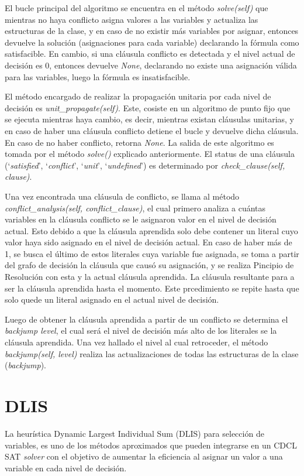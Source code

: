 El bucle principal del algoritmo se encuentra en el método \textit{solve(self)} que mientras no haya conflicto asigna valores a las variables y actualiza las estructuras de la clase, y en caso de no existir más variables por asignar, entonces devuelve la solución (asignaciones para cada variable) declarando la fórmula como satisfacible. En cambio, si una cláusula conflicto es detectada y el nivel actual de decisión es 0, entonces devuelve \textit{None}, declarando no existe una asignación válida para las variables, luego la fórmula es insatisfacible.

El método encargado de realizar la propagación unitaria por cada nivel de decisión es \textit{unit\_propagate(self)}. Este, cosiste en un algoritmo de punto fijo que se ejecuta mientras haya cambio, es decir, mientras existan cláusulas unitarias, y en caso de haber una cláusula conflicto detiene el bucle y devuelve dicha cláusula. En caso de no haber conflicto, retorna \textit{None}. La salida de este algoritmo es tomada por el método \textit{solve()} explicado anteriormente. El status de una cláusula (`\textit{satisfied}', `\textit{conflict}', `\textit{unit}', `\textit{undefined}') es determinado por \textit{check\_clause(self, clause)}.

Una vez encontrada una cláusula de conflicto, se llama al método \textit{conflict\_analysis(self, conflict\_clause)}, el cual primero analiza a cuántas variables en la cláusula conflicto se le asignaron valor en el nivel de decisión actual. Esto debido a que la cláusula aprendida solo debe contener un literal cuyo valor haya sido asignado en el nivel de decisión actual. En caso de haber más de 1, se busca el último de estos literales cuya variable fue asignada, se toma a partir del grafo de decisión la cláusula que causó su asignación, y se realiza Pincipio de Resolución con esta y la actual cláusula aprendida. La cláusula resultante para a ser la cláusula aprendida hasta el momento. Este prcedimiento se repite hasta que solo quede un literal asignado en el actual nivel de decisión.

Luego de obtener la cláusula aprendida a partir de un conflicto se determina el \textit{backjump level}, el cual será el nivel de decisión más alto de los literales se la cláusula aprendida. Una vez hallado el nivel al cual retroceder, el método \textit{backjump(self, level)} realiza las actualizaciones de todas las estructuras de la clase (\textit{backjump}).


\section{DLIS}
La heurística Dynamic Largest Individual Sum (DLIS) para selección de variables, es uno de los métodos aproximados que pueden integrarse en un CDCL SAT \textit{solver} con el objetivo de aumentar la eficiencia al asignar un valor a una variable en cada nivel de decisión.

